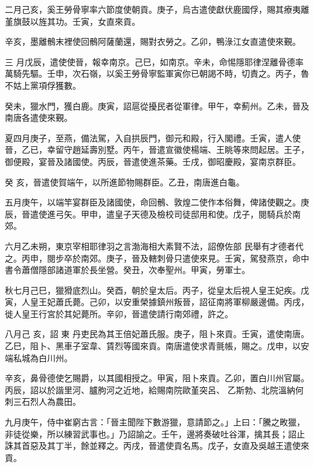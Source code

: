 \begin{pinyinscope}
 二月己亥，奚王勞骨寧率六節度使朝貢。庚子，烏古遣使獻伏鹿國俘，賜其療夷離堇旗鼓以旌其功。壬寅，女直來貢。



 辛亥，墨離鶻末裡使回鶻阿薩蘭還，賜對衣勞之。乙卯，鴨淥江女直遣使來覲。



 三
 月戊辰，遣使使晉，報幸南京。己巳，如南京。辛未，命惕隱耶律涅離骨德率萬騎先驅。壬申，次石嶺，以奚王勞骨寧監軍寅你已朝謁不時，切責之。丙子，魯不姑上黨項俘獲數。



 癸未，獵水門，獲白鹿。庚寅，詔扈從擾民者從軍律。甲午，幸薊州。乙未，晉及南唐各遣使來覲。



 夏四月庚子，至燕，備法駕，入自拱辰門，御元和殿，行入閣禮。壬寅，遣人使晉，乙已，幸留守趙延壽別墅。丙午，晉遣宣徽使楊端、王眺等來問起居。王子，御便殿，宴晉及諸國使。丙辰，晉遣使進茶藥。壬戌，御昭慶殿，宴南京群臣。



 癸
 亥，晉遣使賀端午，以所進節物賜群臣。乙丑，南唐進白龜。



 五月庚午，以端竿宴群臣及諸國使，命回鶻、敦煌二使作本俗舞，俾諸使觀之。庚辰，晉遣使進弓矢。甲申，遣皇子天德及檢校司徒邸用和使。戊子，閱騎兵於南郊。



 六月乙未朔，東京宰相耶律羽之言渤海相大素賢不法，詔僚佐部
 民舉有才德者代之。丙申，閱步卒於南郊。庚子，晉及轄刺骨只遣使來見。壬寅，駕發燕京，命中書令蕭僧隱部諸道軍於長坐營。癸丑，次奉聖州。甲寅，勞軍士。



 秋七月己巳，獵猾底烈山。癸酉，朝於皇太后。丙子，從皇太后視人皇王妃疾。戊寅，人皇王妃蕭氏薨。己卯，以安重榮據鎮州叛晉，詔征南將軍柳嚴邊備。丙戌，徙人皇王行宮於其妃薨所。辛卯，晉遣使請行南郊禮，許之。



 八月己
 亥，詔
 東
 丹吏民為其王倍妃蕭氏服。庚子，阻卜來貢。壬寅，遣使南唐。乙巳，阻卜、黑車子室韋、賃烈等國來貢。南唐遣使求青氈帳，賜之。戊申，以安端私城為白川州。



 辛亥，鼻骨德使乞賜爵，以其國相授之。甲寅，阻卜來貢。乙卯，置白川州官屬。丙辰，詔以於諧里河、臚朐河之近地，給賜南院歐堇突呂、
 乙斯勃、北院溫納何刺三石烈人為農田。



 九月庚午，侍中崔窮古言：「晉主聞陛下數游獵，意請節之。」上曰：「騰之畋獵，非徒從樂，所以練習武事也。」乃詔諭之。壬午，邊將奏破吐谷渾，擒其長；詔止誅其首惡及其丁半，餘並釋之。丙戌，晉遣使貢名馬。戊子，女直及吳越王遣使來貢。




\end{pinyinscope}
